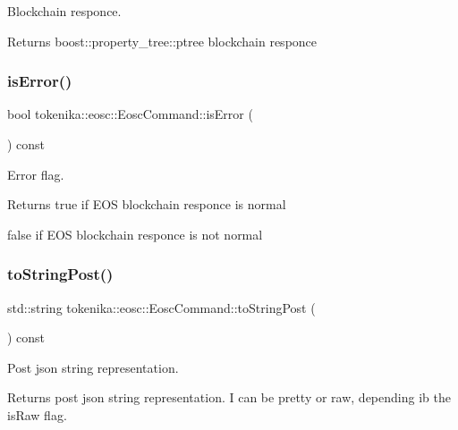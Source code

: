 Blockchain responce. 

\begin{DoxyReturn}{Returns}
boost\+::property\+\_\+tree\+::ptree blockchain responce 
\end{DoxyReturn}
\mbox{\label{classtokenika_1_1eosc_1_1_eosc_command_a63f3adace3f84b59f64c5a54ca0c18dc}} 
\subsubsection{\texorpdfstring{is\+Error()}{isError()}}
{\footnotesize\ttfamily bool tokenika\+::eosc\+::\+Eosc\+Command\+::is\+Error (\begin{DoxyParamCaption}{ }\end{DoxyParamCaption}) const\hspace{0.3cm}{\ttfamily [inline]}}



Error flag. 

\begin{DoxyReturn}{Returns}
true if E\+OS blockchain responce is normal 

false if E\+OS blockchain responce is not normal 
\end{DoxyReturn}
\mbox{\label{classtokenika_1_1eosc_1_1_eosc_command_a1cb0362dceb5999e7e06078223b20d91}} 
\subsubsection{\texorpdfstring{to\+String\+Post()}{toStringPost()}}
{\footnotesize\ttfamily std\+::string tokenika\+::eosc\+::\+Eosc\+Command\+::to\+String\+Post (\begin{DoxyParamCaption}{ }\end{DoxyParamCaption}) const}



Post json string representation. 

Returns post json string representation. I can be pretty or raw, depending ib the {\ttfamily is\+Raw} flag.

